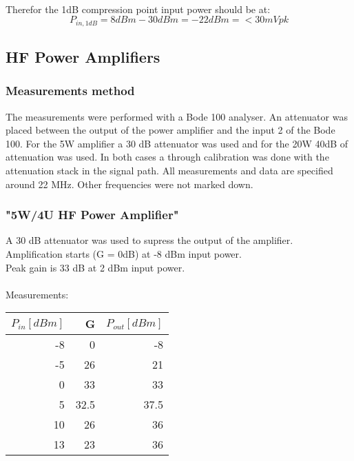\documentclass{article}
\begin{document}
\paragraph{}
Therefor the 1dB compression point input power should be at:
\begin{equation}
 P_{in, 1dB} = 8 dBm - 30 dBm = -22 dBm = <30mVpk
\end{equation}

\subsection{HF Power Amplifiers}
\subsubsection{Measurements method}
The measurements were performed with a Bode 100 analyser. An attenuator was placed between the output of the power amplifier and the input 2 of the Bode 100. For the 5W amplifier a 30 dB attenuator was used and for the 20W 40dB of attenuation was used. In both cases a through calibration was done with the attenuation stack in the signal path. All measurements and data are specified around 22 MHz. Other frequencies were not marked down.

\subsubsection{"5W/4U HF Power Amplifier"}
    A 30 dB attenuator was used to supress the output of the amplifier.
    Amplification starts (G = 0dB) at -8 dBm input power.\\
    Peak gain is 33 dB at 2 dBm input power.

    \paragraph{}
    Measurements:
    \begin{table}[H]
        \centering
        \begin{tabular}{|r|r|r|}
            \hline
            $ P_{in} [dBm] $ & G & $P_{out} [dBm] $ \\
            \hline 
             -8 & 0 & -8 \\
             -5 & 26 & 21 \\
             0 & 33 & 33 \\
             5 & 32.5 & 37.5 \\
             10 & 26 & 36 \\
             13 & 23 & 36 \\
            \hline
        \end{tabular}
        \label{tab:my_label}
    \end{table}
\end{document}
